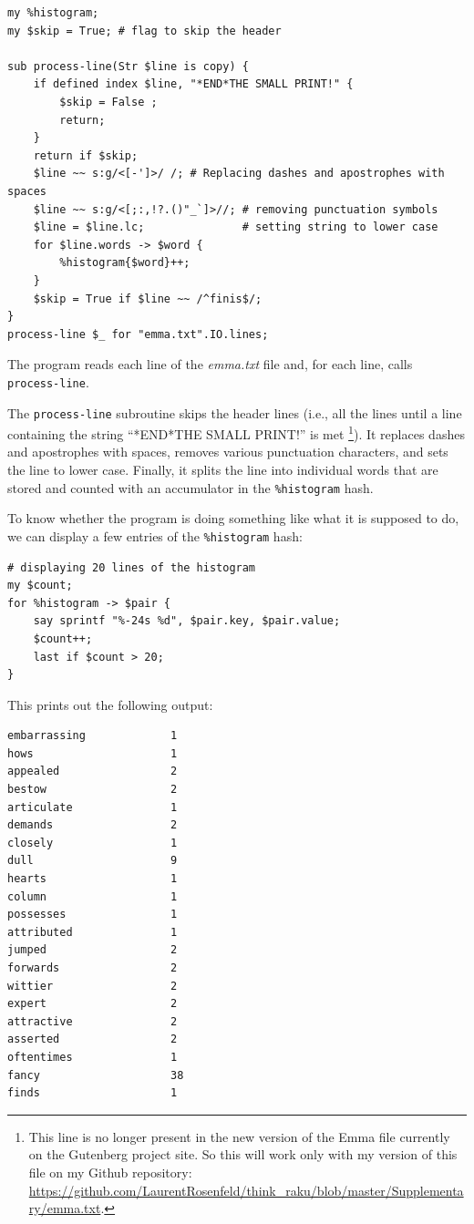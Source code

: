 \begin{verbatim}
my %histogram;
my $skip = True; # flag to skip the header

sub process-line(Str $line is copy) {
    if defined index $line, "*END*THE SMALL PRINT!" {
        $skip = False ;
        return;
    }
    return if $skip;
    $line ~~ s:g/<[-']>/ /; # Replacing dashes and apostrophes with spaces
    $line ~~ s:g/<[;:,!?.()"_`]>//; # removing punctuation symbols
    $line = $line.lc;               # setting string to lower case
    for $line.words -> $word {
        %histogram{$word}++;
    }
	$skip = True if $line ~~ /^finis$/;
}
process-line $_ for "emma.txt".IO.lines; 
\end{verbatim}
%

The program reads each line of the \emph{emma.txt} file and, for 
each line, calls \verb"process-line". 

The \verb"process-line" subroutine skips the header lines 
(i.e., all the lines until a line containing the string
``*END*THE SMALL PRINT!'' 
is met \footnote{This line is no longer present in the new version of 
the Emma file currently on the Gutenberg project site. So this will 
work only with my version of this file on my Github repository:  
\url{https://github.com/LaurentRosenfeld/think_raku/blob/master/Supplementary/emma.txt}.}). It replaces dashes and apostrophes with spaces, removes 
various punctuation characters, and sets the line to lower case. 
Finally, it splits the line into individual words that are 
stored and counted with an accumulator in the \verb'%histogram' 
hash.

To know whether the program is doing something like what 
it is supposed to do, we can display a few entries of the 
\verb'%histogram' hash:

\begin{verbatim}
# displaying 20 lines of the histogram
my $count;
for %histogram -> $pair {
    say sprintf "%-24s %d", $pair.key, $pair.value;
    $count++;
    last if $count > 20;
}
\end{verbatim}

This prints out the following output:

\begin{verbatim}
embarrassing             1
hows                     1
appealed                 2
bestow                   2
articulate               1
demands                  2
closely                  1
dull                     9
hearts                   1
column                   1
possesses                1
attributed               1
jumped                   2
forwards                 2
wittier                  2
expert                   2
attractive               2
asserted                 2
oftentimes               1
fancy                    38
finds                    1
\end{verbatim}


